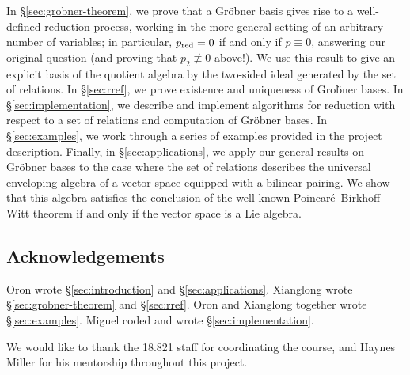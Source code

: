 In \S\ref{sec:grobner-theorem}, we prove that a Gr\"obner basis gives rise to a well-defined reduction process, working in the more general setting of an arbitrary number of variables; in particular, $p_{\mathrm{red}}=0$ if and only if $p\equiv 0$, answering our original question (and proving that $p_2\not\equiv 0$ above!). We use this result to give an explicit basis of the quotient algebra by the two-sided ideal generated by the set of relations. In \S\ref{sec:rref}, we prove existence and uniqueness of Gro\"bner bases. In \S\ref{sec:implementation}, we describe and implement algorithms for reduction with respect to a set of relations and computation of Gr\"obner bases. In \S\ref{sec:examples}, we work through a series of examples provided in the project description. Finally, in \S\ref{sec:applications}, we apply our general results on Gr\"obner bases to the case where the set of relations describes the universal enveloping algebra of a vector space equipped with a bilinear pairing. We show that this algebra satisfies the conclusion of the well-known Poincar\'e--Birkhoff--Witt theorem if and only if the vector space is a Lie algebra.

\subsection*{Acknowledgements}

Oron wrote \S\ref{sec:introduction} and \S\ref{sec:applications}. Xianglong wrote \S\ref{sec:grobner-theorem} and \S\ref{sec:rref}. Oron and Xianglong together wrote \S\ref{sec:examples}. Miguel coded and wrote \S\ref{sec:implementation}.

We would like to thank the 18.821 staff for coordinating the course, and Haynes Miller for his mentorship throughout this project.

